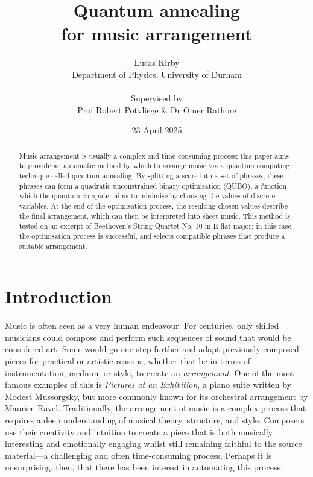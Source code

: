 \documentclass[12pt]{article}
\title{\Huge \bfseries Quantum annealing\\for music arrangement}
\author{Lucas Kirby\\\normalsize Department of Physics, University of Durham\\\\\normalsize Supervised by\\\normalsize Prof Robert Potvliege \& Dr Omer Rathore}
\date{\normalsize 23 April 2025}
\theoremstyle{definition}
\begin{document}
\maketitle

\vfill

\begin{abstract}              

Music arrangement is usually a complex and time-consuming process; this paper aims to provide an automatic method by which to arrange music via a quantum computing technique called quantum annealing. By splitting a score into a set of phrases, these phrases can form a quadratic unconstrained binary optimisation (QUBO), a function which the quantum computer aims to minimise by choosing the values of discrete variables. At the end of the optimisation process, the resulting chosen values describe the final arrangement, which can then be interpreted into sheet music. This method is tested on an excerpt of Beethoven's String Quartet No. 10 in E-flat major; in this case, the optimisation process is successful, and selects compatible phrases that produce a suitable arrangement.

\end{abstract}

\vfill

\begin{center}
    
\end{center}

\thispagestyle{empty}
\clearpage

\tableofcontents
\listoffigures

\thispagestyle{empty}
\clearpage

\section{Introduction}

Music is often seen as a very human endeavour. For centuries, only skilled musicians could compose and perform such sequences of sound that would be considered art. Some would go one step further and adapt previously composed pieces for practical or artistic reasons, whether that be in terms of instrumentation, medium, or style, to create an \textit{arrangement}. One of the most famous examples of this is \textit{Pictures at an Exhibition}, a piano suite written by Modest Mussorgsky, but more commonly known for its orchestral arrangement by Maurice Ravel.
Traditionally, the arrangement of music is a complex process that requires a deep understanding of musical theory, structure, and style. Composers use their creativity and intuition to create a piece that is both musically interesting and emotionally engaging whilst still remaining faithful to the source material—a challenging and often time-consuming process. Perhaps it is unsurprising, then, that there has been interest in automating this process.
\end{document}
